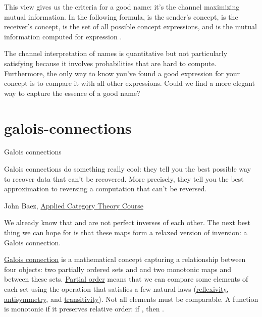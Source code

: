 \documentclass{article}
\begin{document}
This view gives us the criteria for a good name: it's the channel maximizing mutual information.
In the following formula,  is the sender's concept,  is the receiver's concept,  is the set of all possible concept expressions, and  is the mutual information computed for expression .


The channel interpretation of names is quantitative but not particularly satisfying because it involves probabilities that are hard to compute.
Furthermore, the only way to know you've found a good expression for your concept is to compare it with all other expressions.
Could we find a more elegant way to capture the essence of a good name?

\section{galois-connections}{Galois connections}
\epigraph{
  Galois connections do something really cool: they tell you the best possible way to recover data that can't be recovered.
  More precisely, they tell you the best approximation to reversing a computation that can't be reversed.
}{John Baez, \href{https://math.ucr.edu/home/baez/act_course/lecture_5.html}{Applied Category Theory Course}}

We already know that  and  are not perfect inverses of each other.
The next best thing we can hope for is that these maps form a relaxed version of inversion: a Galois connection.

\href{https://en.wikipedia.org/wiki/Galois_connection}{Galois connection} is a mathematical concept capturing a relationship between four objects: two partially ordered sets  and  and two monotonic maps  and  between these sets.
\href{https://en.wikipedia.org/wiki/Partially_ordered_set#Partial_orders}{Partial order} means that we can compare some elements of each set using the \math{\leq} operation that satisfies a few natural laws (\href{https://en.wikipedia.org/wiki/Reflexive_relation}{reflexivity}, \href{https://en.wikipedia.org/wiki/Antisymmetric_relation}{antisymmetry}, and \href{https://en.wikipedia.org/wiki/Transitive_relation}{transitivity}).
Not all elements must be comparable.
A function  is monotonic if it preserves relative order: if , then .
\end{document}
